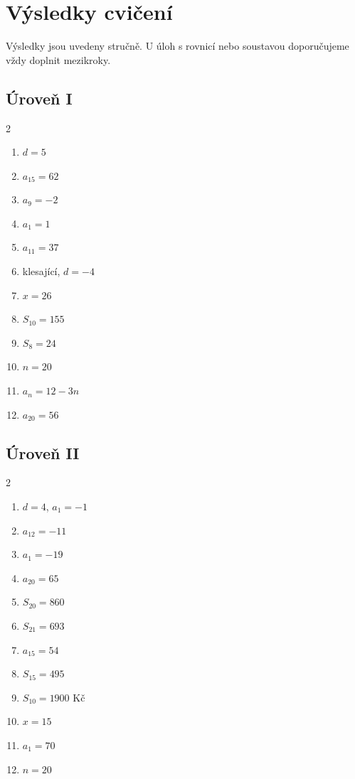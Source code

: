 \documentclass[11pt,a4paper]{article}
\newif\ifshowanswers
\begin{document}
\ifshowanswers
\clearpage
\section{Výsledky cvičení}
Výsledky jsou uvedeny stručně. U úloh s rovnicí nebo soustavou doporučujeme vždy doplnit mezikroky.
\subsection*{Úroveň I}
\begin{multicols}{2}
\begin{enumerate}[label=\textbf{I.\arabic*},itemsep=3pt]
\item $d=5$
\item $a_{15}=62$
\item $a_9=-2$
\item $a_1=1$
\item $a_{11}=37$
\item klesající, $d=-4$
\item $x=26$
\item $S_{10}=155$
\item $S_8=24$
\item $n=20$
\item $a_n=12-3n$
\item $a_{20}=56$
\end{enumerate}
\end{multicols}
\subsection*{Úroveň II}
\begin{multicols}{2}
\begin{enumerate}[label=\textbf{II.\arabic*},itemsep=3pt]
\item $d=4$, $a_1=-1$
\item $a_{12}=-11$
\item $a_1=-19$
\item $a_{20}=65$
\item $S_{20}=860$
\item $S_{21}=693$
\item $a_{15}=54$
\item $S_{15}=495$
\item $S_{10}=1900$ Kč
\item $x=15$
\item $a_1=70$
\item $n=20$
\end{enumerate}
\end{multicols}
\end{document}
